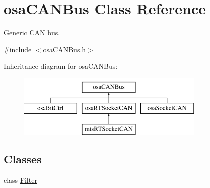 \hypertarget{classosa_c_a_n_bus}{}\section{osa\+C\+A\+N\+Bus Class Reference}
\label{classosa_c_a_n_bus}


Generic C\+A\+N bus.  




{\ttfamily \#include $<$osa\+C\+A\+N\+Bus.\+h$>$}

Inheritance diagram for osa\+C\+A\+N\+Bus\+:\begin{figure}[H]
\begin{center}
\leavevmode
\includegraphics[height=3.000000cm]{de/dbc/classosa_c_a_n_bus}
\end{center}
\end{figure}
\subsection*{Classes}
\begin{DoxyCompactItemize}
\item 
class \hyperlink{classosa_c_a_n_bus_1_1_filter}{Filter}
\end{DoxyCompactItemize}
